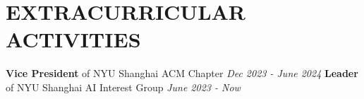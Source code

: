 \documentclass[letterpaper,10.5pt,]{article}
\begin{document}
\section{\color{airforceblue}EXTRACURRICULAR ACTIVITIES}
    \textbf{Vice President} of NYU Shanghai ACM Chapter \hfill \textit{\small Dec 2023 - June 2024} 
    \textbf{Leader} of NYU Shanghai AI Interest Group  \hfill \textit{\small June 2023 - Now} 
\end{document}
